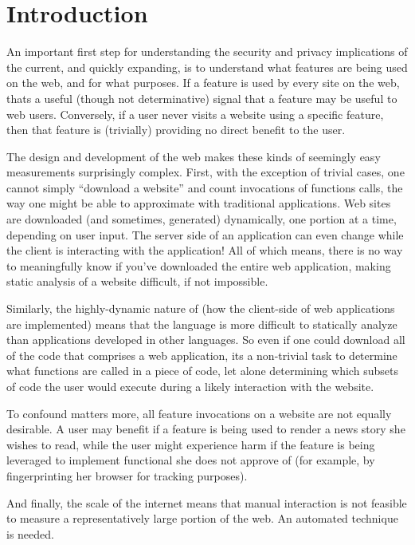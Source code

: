\section{Introduction}
\label{measurement:overview}

An important first step for understanding the security and privacy implications
of the current, and quickly expanding, \WAPI is to understand what features
are being used on the web, and for what purposes.  If a \WAPI feature
is used by every site on the web, thats a useful (though not determinative)
signal that a feature may be useful to web users.  Conversely, if a user
never visits a website using a specific \WAPI feature, then that feature
is (trivially) providing no direct benefit to the user.

The design and development of the web makes these kinds of
seemingly easy measurements surprisingly complex.
First, with the exception of trivial cases, one cannot simply ``download
a website'' and count invocations of functions calls, the way one might be
able to approximate with traditional applications.  Web sites are downloaded
(and sometimes, generated) dynamically, one portion at a time, depending on user
input. The server side of an application can even change while the client is
interacting with the application!  All of which means, there is no way to
meaningfully know if you've downloaded the entire web application, making
static analysis of a website difficult, if not impossible.

Similarly, the highly-dynamic nature of \JS (how the client-side of web
applications are implemented) means that the language is more difficult to
statically analyze than applications developed in other languages.  So even
if one could download all of the \JS code that comprises a web application,
its a non-trivial task to determine what \WAPI functions are called in a piece of
code, let alone determining which subsets of code the user would execute during
a likely interaction with the website.

To confound matters more, all feature invocations on a website are not equally
desirable.  A user may benefit if a feature is being used to render a news
story she wishes to read, while the user might experience harm if the feature
is being leveraged to implement functional she does not approve of (for example,
by fingerprinting her browser for tracking purposes).

And finally, the scale of the internet means that manual interaction is not
feasible to measure a representatively large portion of the web.  An automated
technique is needed.

